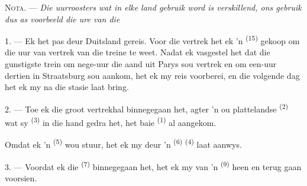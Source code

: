 %
%
%

\VUsaut{4.0mm}
\VUsaut{2.4mm}
\VUsaut{3.4mm}
\textsc{Nota.} --- \textit{Die uurroosters wat in elke land gebruik word is verskillend,
ons gebruik dus as voorbeeld die ure van die} 

1. --- Ek het pas deur Duitsland gereis. Voor die vertrek het ek 'n 
\textsuperscript{(15)} gekoop om die uur van vertrek van die treine te weet. Nadat ek
vasgestel het dat die gunstigste trein om nege-uur die aand uit Parys sou vertrek en om
een-uur dertien in Straatsburg sou aankom, het ek my reis voorberei, en die volgende dag
het ek my na die stasie laat bring.

2. --- Toe ek die groot vertrekhal binnegegaan het, agter 'n ou plattelandse
 \textsuperscript{(2)} wat sy  \textsuperscript{(3)} in
die hand gedra het, het baie  \textsuperscript{(1)} al aangekom.

Omdat ek 'n  \textsuperscript{(5)} wou stuur, het ek my deur 'n
 \textsuperscript{(6)} 
\textsuperscript{(4)} laat aanwys.

3. --- Voordat ek die  \textsuperscript{(7)} binnegegaan het, het ek my
van 'n  \textsuperscript{(9)} heen en terug gaan voorsien.

